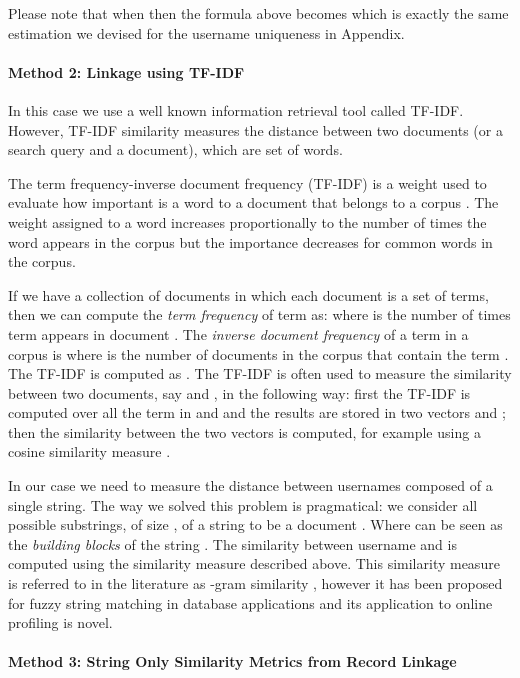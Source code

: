 \documentclass[letterpaper]{sig-alternate}
\begin{document}
Please note that when  then the formula above becomes  which
is exactly the same estimation we devised for the username uniqueness in Appendix.



\paragraph{Method 2: Linkage using TF-IDF}

In this case we use a well known information retrieval tool called TF-IDF.
However, TF-IDF similarity measures the distance between two documents (or a
search query and a document), which are set of words. 

The term frequency-inverse document frequency (TF-IDF) is a weight used to evaluate
how important is a word to a document that belongs to a corpus \cite{TFIDF}. 
The weight assigned to a word increases proportionally to the number of times
the word appears in the corpus but the importance decreases for common words in
the corpus.

If we have a collection of documents  in which each document  is a
set of terms, then we can compute the {\em term frequency} of term 
as:  where  is the number
of times term  appears in document .  The {\em inverse document
frequency} of a term  in a corpus  is  where
 is the number of documents in the corpus that contain the term .
The TF-IDF is computed as .
The TF-IDF is often used to measure the similarity between two documents, say
 and , in the following way: first the TF-IDF is computed over all the
term in  and  and the results are stored in two vectors  and ;
then the similarity between the two vectors is computed, for example using a cosine
similarity measure .


In our case we need to
measure the distance between usernames composed of a single string.
The way we solved this problem is pragmatical: we consider all possible
substrings, of size , of a string  to be a document . Where  can be seen as the {\em
building blocks} of the string .  The similarity between username  and
 is computed using the similarity measure described above. This
similarity measure is referred to in the literature as -gram similarity
\cite{qgrams}, however it has been proposed for fuzzy string matching in
database applications and its application to online profiling is novel.


\paragraph{Method 3: String Only Similarity Metrics from Record Linkage}
\label{back:tfidf}
\end{document}
